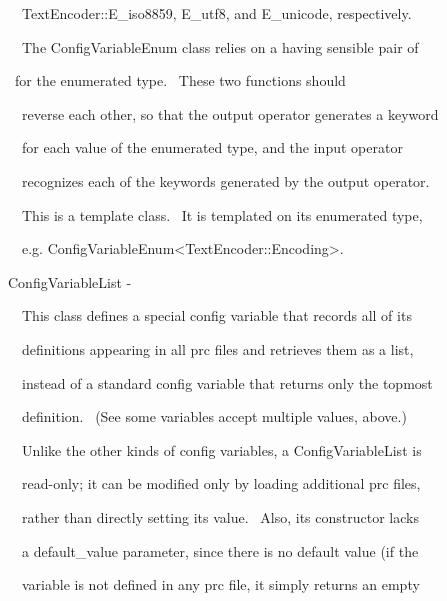 \documentclass[a4paper]{article}
\begin{document}
{\color{black}
\ \ TextEncoder::E\_iso8859, E\_utf8, and E\_unicode, respectively.}


\bigskip

{\color{black}
\ \ The ConfigVariableEnum class relies on a having sensible pair of}


{\color{black}
\ for the enumerated type. \ These two functions should}

{\color{black}
\ \ reverse each other, so that the output operator generates a keyword}

{\color{black}
\ \ for each value of the enumerated type, and the input operator}

{\color{black}
\ \ recognizes each of the keywords generated by the output operator.}


\bigskip

{\color{black}
\ \ This is a template class. \ It is templated on its enumerated type,}

{\color{black}
\ \ e.g. ConfigVariableEnum{\textless}TextEncoder::Encoding{\textgreater}.}


\bigskip

{\color{black}
ConfigVariableList -}


\bigskip

{\color{black}
\ \ This class defines a special config variable that records all of its}

{\color{black}
\ \ definitions appearing in all prc files and retrieves them as a list,}

{\color{black}
\ \ instead of a standard config variable that returns only the topmost}

{\color{black}
\ \ definition. \ (See {\textquotedbl}some variables accept multiple values{\textquotedbl}, above.)}


\bigskip

{\color{black}
\ \ Unlike the other kinds of config variables, a ConfigVariableList is}

{\color{black}
\ \ read-only; it can be modified only by loading additional prc files,}

{\color{black}
\ \ rather than directly setting its value. \ Also, its constructor lacks}

{\color{black}
\ \ a default\_value parameter, since there is no default value (if the}

{\color{black}
\ \ variable is not defined in any prc file, it simply returns an empty}
\end{document}
